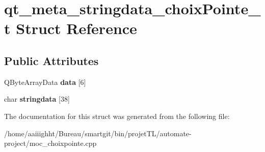 \hypertarget{structqt__meta__stringdata__choix_pointe__t}{\section{qt\-\_\-meta\-\_\-stringdata\-\_\-choix\-Pointe\-\_\-t Struct Reference}
\label{structqt__meta__stringdata__choix_pointe__t}
}
\subsection*{Public Attributes}
\begin{DoxyCompactItemize}
\item 
\hypertarget{structqt__meta__stringdata__choix_pointe__t_ad067803f2ec643442ccd9801406f26e7}{Q\-Byte\-Array\-Data {\bfseries data} \mbox{[}6\mbox{]}}\label{structqt__meta__stringdata__choix_pointe__t_ad067803f2ec643442ccd9801406f26e7}

\item 
\hypertarget{structqt__meta__stringdata__choix_pointe__t_ab9f8842d62869b814e23399b937c1090}{char {\bfseries stringdata} \mbox{[}38\mbox{]}}\label{structqt__meta__stringdata__choix_pointe__t_ab9f8842d62869b814e23399b937c1090}

\end{DoxyCompactItemize}


The documentation for this struct was generated from the following file\-:\begin{DoxyCompactItemize}
\item 
/home/aaiiighht/\-Bureau/smartgit/bin/projet\-T\-L/automate-\/project/moc\-\_\-choixpointe.\-cpp\end{DoxyCompactItemize}
